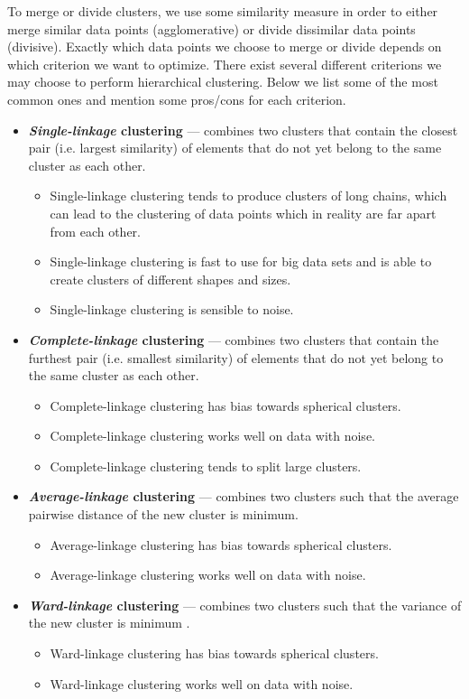 To merge or divide clusters, we use some similarity measure in order to either merge similar data points (agglomerative) or divide dissimilar data points (divisive). Exactly which data points we choose to merge or divide depends on which criterion we want to optimize. There exist several different criterions we may choose to perform hierarchical clustering. Below we list some of the most common ones and mention some pros/cons for each criterion.
\begin{itemize}
    \item \textbf{\textit{Single-linkage} clustering} --- combines two clusters that contain the closest pair (i.e. largest similarity) of elements that do not yet belong to the same cluster as each other.
    \begin{itemize}
        \item Single-linkage clustering tends to produce clusters of long chains, which can lead to the clustering of data points which in reality are far apart from each other.
        \item Single-linkage clustering is fast to use for big data sets and is able to create clusters of different shapes and sizes.
        \item Single-linkage clustering is sensible to noise.
    \end{itemize}
    \item \textbf{\textit{Complete-linkage} clustering}  --- combines two clusters that contain the furthest pair (i.e. smallest similarity) of elements that do not yet belong to the same cluster as each other.
    \begin{itemize}
        \item Complete-linkage clustering has bias towards spherical clusters.
        \item Complete-linkage clustering works well on data with noise.
        \item Complete-linkage clustering tends to split large clusters.
    \end{itemize}
    \item \textbf{\textit{Average-linkage} clustering} --- combines two clusters such that the average pairwise distance of the new cluster is minimum.
    \begin{itemize}
        \item Average-linkage clustering has bias towards spherical clusters.
        \item Average-linkage clustering works well on data with noise.
    \end{itemize}
    \item \textbf{\textit{Ward-linkage} clustering} --- combines two clusters such that the variance of the new cluster is minimum \cite{Ward1963}.
    \begin{itemize}
        \item Ward-linkage clustering has bias towards spherical clusters.
        \item Ward-linkage clustering works well on data with noise.
    \end{itemize}
\end{itemize}

